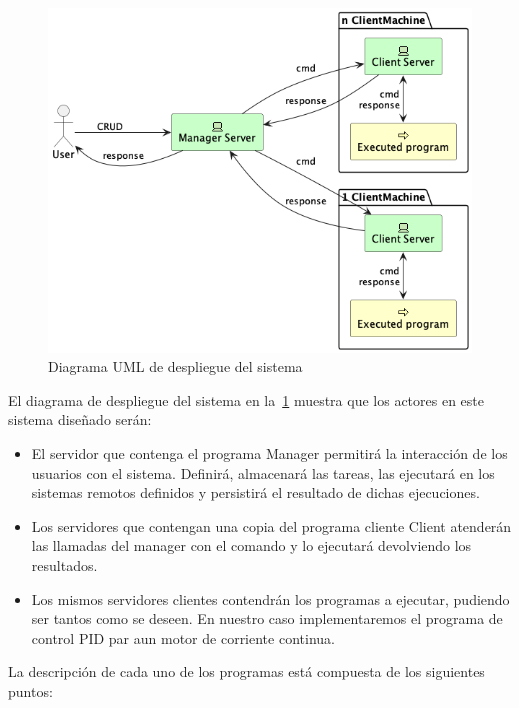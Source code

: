 
\begin{figure}[H]
    \centering
    \includegraphics[height=0.4\textheight]{./part/Proyecto_ejecutivo/memoria_descriptiva/descripcionDelProyecto/manager/uml/systemConcept}
    \caption{Diagrama UML de despliegue del sistema}\label{fig:Diagrama UML de despliegue del sistema}
\end{figure}

El diagrama de despliegue del sistema en la~\cref{fig:Diagrama UML de despliegue del sistema} muestra que los actores en este sistema diseñado serán:
\begin{itemize}
    \item El servidor que contenga el programa \gls{Manager} permitirá la interacción de los usuarios con el sistema.
    Definirá, almacenará las tareas, las ejecutará en los sistemas remotos definidos y persistirá el resultado de dichas ejecuciones.
    \item Los servidores que contengan una copia del programa cliente \gls{Client} atenderán las llamadas del manager con el comando y lo ejecutará devolviendo los resultados.
    \item Los mismos servidores clientes contendrán los programas a ejecutar, pudiendo ser tantos como se deseen.
    En nuestro caso implementaremos el programa de control PID par aun motor de corriente continua.
\end{itemize}

La descripción de cada uno de los programas está compuesta de los siguientes puntos:

